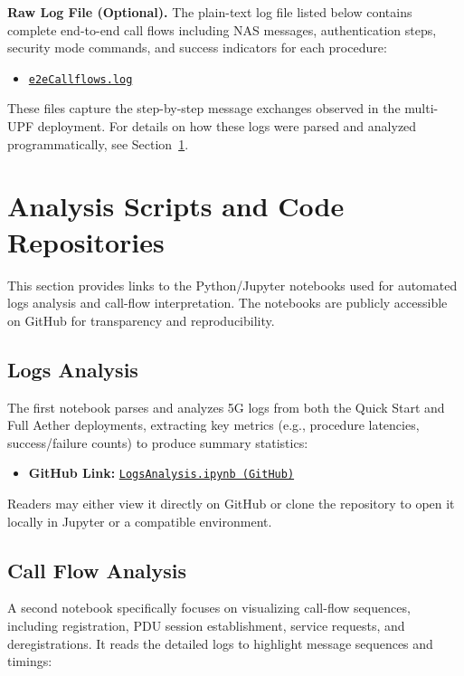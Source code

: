 \noindent
\textbf{Raw Log File (Optional).}  
\label{logs:e2eCallflows}
The plain-text log file listed below contains complete end-to-end call flows including 
NAS messages, authentication steps, security mode commands, and success indicators 
for each procedure:

\begin{itemize}
  \item \href{https://github.com/hxngillani/Thesis-2025/blob/d0960d3a9d816eca167b428b2a6cfdfa707a49eb/Logs%26CallFlows%20Analysis/e2eCallflows.log}{\texttt{e2eCallflows.log}}
\end{itemize}

\noindent
These files capture the step-by-step message exchanges observed in the multi-UPF 
deployment. For details on how these logs were parsed and analyzed programmatically,
see Section~\ref{sec:analysis-scripts}.

\section{Analysis Scripts and Code Repositories}
\label{sec:analysis-scripts}

This section provides links to the Python/Jupyter notebooks used for automated logs 
analysis and call-flow interpretation. The notebooks are publicly accessible on GitHub 
for transparency and reproducibility.

\subsection{Logs Analysis}
The first notebook parses and analyzes 5G logs from both the Quick Start and Full 
Aether deployments, extracting key metrics (e.g., procedure latencies, success/failure 
counts) to produce summary statistics:

\begin{itemize}
    \item \textbf{GitHub Link:}
    \href{https://github.com/hxngillani/Thesis-2025/blob/d0960d3a9d816eca167b428b2a6cfdfa707a49eb/Logs%26CallFlows%20Analysis/LogsAnalysis.ipynb}{\texttt{LogsAnalysis.ipynb (GitHub)}}
\end{itemize}

\noindent
Readers may either view it directly on GitHub or clone the repository to open it locally 
in Jupyter or a compatible environment.

\subsection{Call Flow Analysis}
A second notebook specifically focuses on visualizing call-flow sequences, including 
registration, PDU session establishment, service requests, and deregistrations. It reads
the detailed logs to highlight message sequences and timings:

